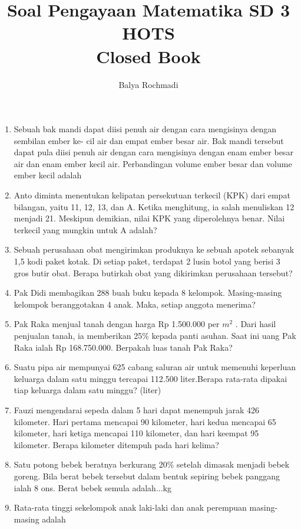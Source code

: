 \documentclass[12pt,a4paper,draft,final,oneside,twoside,openright,openany]{article}
\author{Balya Rochmadi}
\title{Soal Pengayaan Matematika SD 3 HOTS \\Closed Book}
\begin{document}
	\maketitle
		\noindent\makebox[\linewidth]{\rule{\paperwidth}{0.4pt}}
	\Large
	\begin{enumerate}
		\item Sebuah bak mandi dapat diisi penuh air dengan cara mengisinya dengan sembilan ember ke-
		cil air dan empat ember besar air. Bak mandi tersebut dapat pula diisi penuh air dengan cara
		mengisinya dengan enam ember besar air dan enam ember kecil air. Perbandingan volume
		ember besar dan volume ember kecil adalah
		\item Anto diminta menentukan kelipatan persekutuan terkecil (KPK) dari empat bilangan, yaitu 11,
		12, 13, dan A. Ketika menghitung, ia salah menuliskan 12 menjadi 21. Meskipun demikian,
		nilai KPK yang diperolehnya benar. Nilai terkecil yang mungkin untuk A adalah?
		\item Sebuah perusahaan obat mengirimkan
		produknya ke sebuah apotek sebanyak 1,5 kodi
		paket kotak. Di setiap paket, terdapat 2 lusin
		botol yang berisi 3 gros butir obat. Berapa
		butirkah obat yang dikirimkan perusahaan
		tersebut?
		\item Pak Didi membagikan 288 buah buku kepada 8 kelompok. Masing-masing kelompok beranggotakan 4 anak. Maka, setiap anggota menerima?
		\item Pak Raka menjual tanah dengan harga Rp 1.500.000 per $m^2$ . Dari hasil penjualan 
		tanah, ia memberikan 25$\%$ kepada panti asuhan. Saat ini uang Pak Raka ialah Rp 
		168.750.000. Berpakah luas tanah Pak Raka? 
		\item Suatu pipa air mempunyai 625 cabang saluran air untuk memenuhi keperluan 
		keluarga dalam satu minggu tercapai 112.500 liter.Berapa rata-rata dipakai tiap 
		keluarga dalam satu minggu? (liter)
		\item Fauzi mengendarai sepeda dalam 5 hari dapat menempuh jarak 426 kilometer. 
		Hari pertama mencapai 90 kilometer, hari kedua mencapai 65 kilometer, hari 
		ketiga mencapai 110 kilometer, dan hari keempat 95 kilometer. 
		Berapa kilometer ditempuh pada hari kelima? 
		\item Satu potong bebek beratnya berkurang 20$\%$ setelah dimasak menjadi bebek 
		goreng. Bila berat bebek tersebut dalam bentuk sepiring bebek panggang  ialah 8 
		ons. Berat bebek semula adalah...kg 
		\item Rata-rata tinggi sekelompok anak laki-laki
		dan anak perempuan masing-masing adalah

\end{enumerate}
\end{document}
